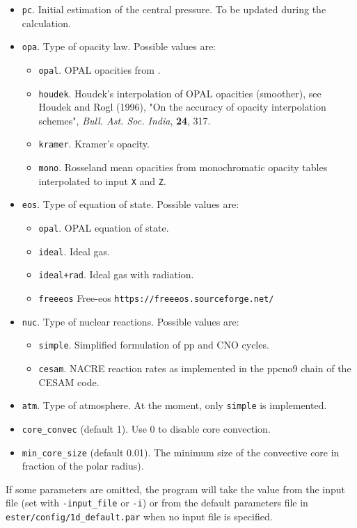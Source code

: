 \begin{itemize}
\item {\tt pc}. Initial estimation of the central pressure. To be updated during the
calculation.
\item {\tt opa}. Type of opacity law. Possible values are:
\begin{itemize}
\item {\tt opal}. OPAL opacities from \cite{GN93}.
\item {\tt houdek}. Houdek's interpolation of OPAL opacities (smoother),
see Houdek and Rogl (1996), "On the accuracy of opacity interpolation
schemes", {\it Bull. Ast. Soc. India}, {\bf 24}, 317.
\item {\tt kramer}. Kramer's opacity.
\item {\tt mono}. Rosseland mean opacities from monochromatic opacity tables \citep{Mombarg2022} interpolated to input {\tt X} and {\tt Z}. 
\end{itemize}
\item {\tt eos}. Type of equation of state. Possible values are:
\begin{itemize}
\item {\tt opal}. OPAL equation of state.
\item {\tt ideal}. Ideal gas.
\item {\tt ideal+rad}. Ideal gas with radiation.
\item {\tt freeeos} Free-eos  {\tt https://freeeos.sourceforge.net/}
\end{itemize}
\item {\tt nuc}. Type of nuclear reactions. Possible values are:
\begin{itemize}
\item {\tt simple}. Simplified formulation of pp and CNO cycles. 
\item {\tt cesam}. NACRE reaction rates as implemented in the ppcno9 chain of the CESAM code.
\end{itemize}
\item {\tt atm}. Type of atmosphere. At the moment, only {\tt simple} is implemented.
\item {\tt core\_convec} (default 1). Use 0 to disable core convection.
\item {\tt min\_core\_size} (default 0.01). The minimum size of the convective core
in fraction of the polar radius).
\end{itemize}
If some parameters are omitted, the program will take the value from the input file (set with
{\tt -input\_file} or {\tt -i}) or from the default parameters file in 
{\tt ester/config/1d\_default.par} when no input file is specified.

